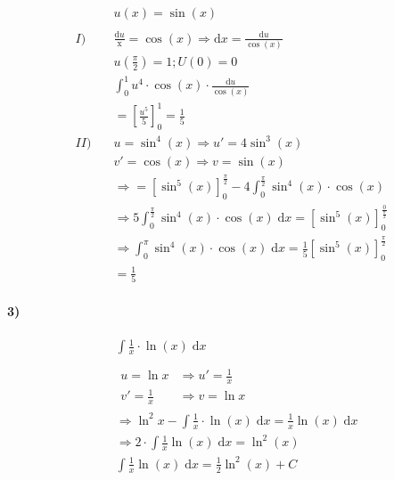 \begin{align*}
	         & u(x) = \sin(x)                                                                                                                  \\
	\\
	I)\quad  & \frac{\mathrm{d}u}{\mathrm{x}} = \cos(x) \Rightarrow \mathrm{d}x = \frac{\mathrm{d}u}{\cos(x)}                                  \\
	         & u(\frac{\pi}{2}) = 1; U(0) = 0                                                                                                  \\
	         & \int_0^1 u^4 \cdot \cos(x) \cdot \frac{\mathrm{d}u}{\cos(x)}                                                                    \\
	         & = {\left[ \frac{u^5}{5} \right]}_0^1 = \frac{1}{5}                                                                              \\
	II)\quad & u = \sin^4(x) \Rightarrow u' = 4 \sin^3 (x)                                                                                     \\
	         & v' = \cos(x) \Rightarrow v = \sin(x)                                                                                            \\
	         & \Rightarrow = {\left[ \sin^5(x) \right]}_0^{\frac{\pi}{2}} - 4 \int_0^{\frac{\pi}{2}} \sin^4 (x) \cdot \cos(x)                  \\
	         & \Rightarrow 5 \int_0^\frac{\pi}{2} \sin^4(x) \cdot \cos(x) \;\mathrm{d}x = {\left[ \sin^5(x) \right]}_0^\frac{0}{\frac{\pi}{2}} \\
	         & \Rightarrow \int_0^\pi \sin^4(x) \cdot \cos(x) \;\mathrm{d}x = \frac{1}{5} {\left[ \sin^5(x) \right]}_0^\frac{\pi}{2}           \\
	         & = \frac{1}{5}
\end{align*}

\paragraph{3)}

\begin{align*}
	 & \int \frac{1}{x} \cdot \ln(x) \;\mathrm{d}x                                                          \\
	\\
	 & \begin{array}{ll}
		u = \ln x        & \Rightarrow u'= \frac{1}{x} \\
		v' = \frac{1}{x} & \Rightarrow v = \ln x
	\end{array}                                                                            \\
	 & \Rightarrow{} \ln^2 x- \int\frac{1}{x} \cdot \ln(x) \;\mathrm{d}x = \frac{1}{x} \ln(x) \;\mathrm{d}x \\
	 & \Rightarrow{} 2 \cdot \int\frac{1}{x} \ln(x) \;\mathrm{d}x = \ln^2(x)                                \\
	 & \int\frac{1}{x} \ln(x) \;\mathrm{d}x = \frac{1}{2} \ln^2 (x) + C
\end{align*}

